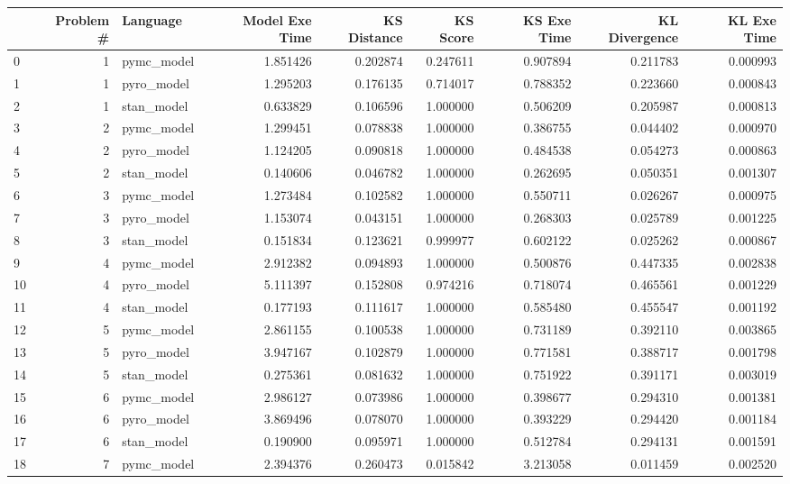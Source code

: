 \begin{tabular}{lrlrrrrrr}
\toprule
 & Problem # & Language & Model Exe Time & KS Distance & KS Score & KS Exe Time & KL Divergence & KL Exe Time \\
\midrule
0 & 1 & pymc_model & 1.851426 & 0.202874 & 0.247611 & 0.907894 & 0.211783 & 0.000993 \\
1 & 1 & pyro_model & 1.295203 & 0.176135 & 0.714017 & 0.788352 & 0.223660 & 0.000843 \\
2 & 1 & stan_model & 0.633829 & 0.106596 & 1.000000 & 0.506209 & 0.205987 & 0.000813 \\
3 & 2 & pymc_model & 1.299451 & 0.078838 & 1.000000 & 0.386755 & 0.044402 & 0.000970 \\
4 & 2 & pyro_model & 1.124205 & 0.090818 & 1.000000 & 0.484538 & 0.054273 & 0.000863 \\
5 & 2 & stan_model & 0.140606 & 0.046782 & 1.000000 & 0.262695 & 0.050351 & 0.001307 \\
6 & 3 & pymc_model & 1.273484 & 0.102582 & 1.000000 & 0.550711 & 0.026267 & 0.000975 \\
7 & 3 & pyro_model & 1.153074 & 0.043151 & 1.000000 & 0.268303 & 0.025789 & 0.001225 \\
8 & 3 & stan_model & 0.151834 & 0.123621 & 0.999977 & 0.602122 & 0.025262 & 0.000867 \\
9 & 4 & pymc_model & 2.912382 & 0.094893 & 1.000000 & 0.500876 & 0.447335 & 0.002838 \\
10 & 4 & pyro_model & 5.111397 & 0.152808 & 0.974216 & 0.718074 & 0.465561 & 0.001229 \\
11 & 4 & stan_model & 0.177193 & 0.111617 & 1.000000 & 0.585480 & 0.455547 & 0.001192 \\
12 & 5 & pymc_model & 2.861155 & 0.100538 & 1.000000 & 0.731189 & 0.392110 & 0.003865 \\
13 & 5 & pyro_model & 3.947167 & 0.102879 & 1.000000 & 0.771581 & 0.388717 & 0.001798 \\
14 & 5 & stan_model & 0.275361 & 0.081632 & 1.000000 & 0.751922 & 0.391171 & 0.003019 \\
15 & 6 & pymc_model & 2.986127 & 0.073986 & 1.000000 & 0.398677 & 0.294310 & 0.001381 \\
16 & 6 & pyro_model & 3.869496 & 0.078070 & 1.000000 & 0.393229 & 0.294420 & 0.001184 \\
17 & 6 & stan_model & 0.190900 & 0.095971 & 1.000000 & 0.512784 & 0.294131 & 0.001591 \\
18 & 7 & pymc_model & 2.394376 & 0.260473 & 0.015842 & 3.213058 & 0.011459 & 0.002520 \\

\end{tabular}
